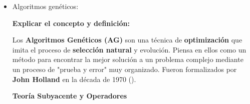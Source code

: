 \documentclass[letterpaper,12pt]{article}
\begin{document}
\begin{itemize}
    \begin{quote}
    
        ``Ambas funciones de activación no lineales [umbral y logística] aseguran la importante propiedad de que la red entera de unidades puede representar una \textbf{función no lineal} (ver Ejercicio 18.22).''
    
        (Russell \& Norvig, 3ª ed., Capítulo 18, Sección 18.7).
    
    \end{quote}
    


\begin{quote}

    ``La Regla Delta se utiliza para actualizar los pesos de una unidad con una \textbf{función de activación lineal} y se basa en el principio de \textbf{descenso de gradiente estocástico} para minimizar la suma del error cuadrático.''

    (Russell \& Norvig, 3ª ed., Capítulo 18, Sección 18.8).

\end{quote} 
        \item Algoritmos genéticos:
        
        \textbf{Explicar el concepto y definición:}
        \vspace{0.2 cm}

        Los \textbf{Algoritmos Genéticos (AG)} son una técnica de \textbf{optimización} que imita el proceso de \textbf{selección natural} y evolución. Piensa en ellos como un método para encontrar la mejor solución a un problema complejo mediante un proceso de "prueba y error" muy organizado. Fueron formalizados por \textbf{John Holland} en la década de 1970 (\cite{Holland1975}).

        \newpage
        \textbf{Teoría Subyacente y Operadores}
        

\end{itemize}
\end{document}
